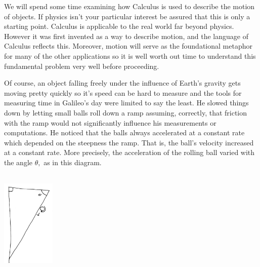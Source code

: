 
We will spend some time examining how Calculus is used to describe the
motion of objects. If physics isn't your particular interest be
assured that this is only a starting point. Calculus is applicable to
the real world far beyond physics. However it was first invented as a
way to describe motion, and the language of Calculus reflects
this. Moreover, motion will serve as the foundational metaphor for
many of the other applications so it is well worth out time to
understand this fundamental problem very well before proceeding.

Of course, an object falling freely under the influence of Earth's
gravity gets moving pretty quickly so it's speed can be hard to
measure and the tools for measuring time in Galileo's day were limited
to say the least. He slowed things down by letting small balls roll
down a ramp assuming, correctly, that friction with the ramp would not
significantly influence his measurements or computations. He noticed
that the balls always accelerated at a constant rate which depended on
the steepness the ramp. That is, the ball's velocity increased at a
constant rate. More precisely, the acceleration of the rolling ball varied with the
angle $\theta,$ as in this diagram. \\
\centerline{\includegraphics*[height=2in,width=1in,angle=90]{Figures/GalileoRamp}}


